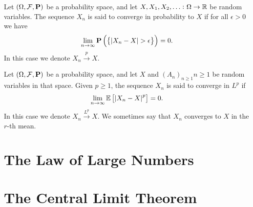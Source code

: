 \documentclass[11pt,a4paper]{article}
\begin{document}
  \begin{definition}
    Let $(\Omega, \mathcal F, \mathbf{P})$ be a probability space, and let
    $X,X_1,X_2,\dots \colon \Omega \to \mathbb{R}$ be random variables.
    The sequence $X_n$ is said to converge in probability to $X$ if
    for all $\epsilon > 0$ we have
    \[
      \lim_{n \to \infty}
      \mathbf{P}\left(\set{\,\abs{X_n - X} > \epsilon}\right) = 0.
    \]
    In this case we denote $X_n \xrightarrow{p} X$.
  \end{definition}

  \begin{definition}[Convergence in $L^p$]
    Let $(\Omega, \mathcal F, \mathbf{P})$ be a probability space, and let
    $X$ and $(A_n)_{n \geq 1}n \geq 1$ be random variables in that space.
    Given $p \geq 1$, the sequence $X_n$ is said to converge in $L^p$
    if
    \[
      \lim_{n \to \infty} \mathbb{E}\left[\,\abs{X_n - X}^p\right] = 0.
    \]
    In this case we denote $X_n \xrightarrow{L^p} X$.
    We sometimes say that $X_n$ converges to $X$ in the $r$-th mean.
  \end{definition}
  



  \section{The Law of Large Numbers}

  \section{The Central Limit Theorem}
\end{document}
